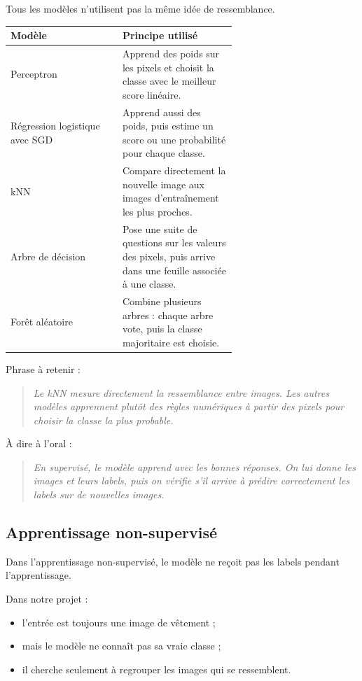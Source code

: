 \documentclass[11pt,a4paper]{article}
\begin{document}
Tous les modèles n'utilisent pas la même idée de ressemblance.

\begin{center}
\small
\begin{tabular}{|>{\RaggedRight\arraybackslash}p{0.32\linewidth}|>{\RaggedRight\arraybackslash}p{0.32\linewidth}|}
\hline
Modèle & Principe utilisé \\
\hline
Perceptron & Apprend des poids sur les pixels et choisit la classe avec le meilleur score linéaire. \\
\hline
Régression logistique avec SGD & Apprend aussi des poids, puis estime un score ou une probabilité pour chaque classe. \\
\hline
kNN & Compare directement la nouvelle image aux images d'entraînement les plus proches. \\
\hline
Arbre de décision & Pose une suite de questions sur les valeurs des pixels, puis arrive dans une feuille associée à une classe. \\
\hline
Forêt aléatoire & Combine plusieurs arbres : chaque arbre vote, puis la classe majoritaire est choisie. \\
\hline
\end{tabular}
\end{center}

Phrase à retenir :

\begin{quote}
\itshape Le kNN mesure directement la ressemblance entre images. Les autres modèles apprennent plutôt des règles numériques à partir des pixels pour choisir la classe la plus probable.
\end{quote}

À dire à l'oral :

\begin{quote}
\itshape En supervisé, le modèle apprend avec les bonnes réponses. On lui donne les images et leurs labels, puis on vérifie s'il arrive à prédire correctement les labels sur de nouvelles images.
\end{quote}

\subsection{Apprentissage non-supervisé}

Dans l'apprentissage non-supervisé, le modèle ne reçoit pas les labels pendant l'apprentissage.

Dans notre projet :

\begin{itemize}
\item l'entrée est toujours une image de vêtement ;
\item mais le modèle ne connaît pas sa vraie classe ;
\item il cherche seulement à regrouper les images qui se ressemblent.
\end{itemize}
\end{document}
